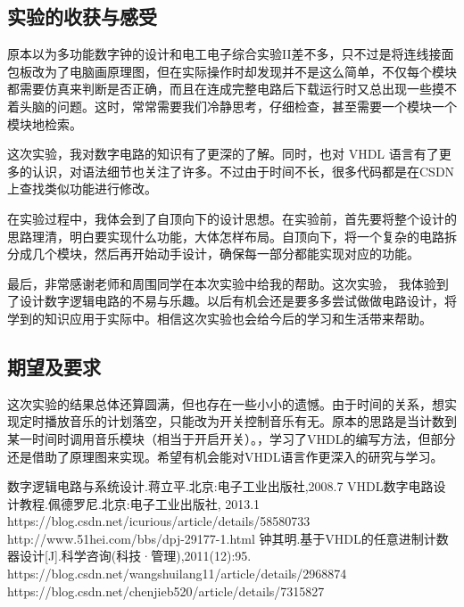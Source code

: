 \documentclass[12pt]{article}
\begin{document}
\subsection{实验的收获与感受}
原本以为多功能数字钟的设计和电工电子综合实验II差不多，只不过是将连线接面包板改为了电脑画原理图，但在实际操作时却发现并不是这么简单，不仅每个模块都需要仿真来判断是否正确，而且在连成完整电路后下载运行时又总出现一些摸不着头脑的问题。这时，常常需要我们冷静思考，仔细检查，甚至需要一个模块一个模块地检索。\par
这次实验，我对数字电路的知识有了更深的了解。同时，也对 VHDL 语言有了更多的认识，对语法细节也关注了许多。不过由于时间不长，很多代码都是在CSDN上查找类似功能进行修改。\par
在实验过程中，我体会到了自顶向下的设计思想。在实验前，首先要将整个设计的思路理清，明白要实现什么功能，大体怎样布局。自顶向下，将一个复杂的电路拆分成几个模块，然后再开始动手设计，确保每一部分都能实现对应的功能。\par
最后，非常感谢老师和周围同学在本次实验中给我的帮助。这次实验， 我体验到了设计数字逻辑电路的不易与乐趣。以后有机会还是要多多尝试做做电路设计，将学到的知识应用于实际中。相信这次实验也会给今后的学习和生活带来帮助。
\subsection{期望及要求}
这次实验的结果总体还算圆满，但也存在一些小小的遗憾。由于时间的关系，想实现定时播放音乐的计划落空，只能改为开关控制音乐有无。原本的思路是当计数到某一时间时调用音乐模块（相当于开启开关）。，学习了VHDL的编写方法，但部分还是借助了原理图来实现。希望有机会能对VHDL语言作更深入的研究与学习。
\begin{thebibliography}{15}\addtolength{\itemsep}{-0.5ex}
数字逻辑电路与系统设计.蒋立平.北京:电子工业出版社,2008.7 
\bibitem{} VHDL数字电路设计教程.佩德罗尼.北京:电子工业出版社, 2013.1
\bibitem{} https://blog.csdn.net/icurious/article/details/58580733
\bibitem{} http://www.51hei.com/bbs/dpj-29177-1.html
\bibitem{} 钟其明.基于VHDL的任意进制计数器设计[J].科学咨询(科技·管理),2011(12):95.
\bibitem{} https://blog.csdn.net/wangshuilang11/article/details/2968874
\bibitem{} https://blog.csdn.net/chenjieb520/article/details/7315827
\end{thebibliography}
\end{document}
